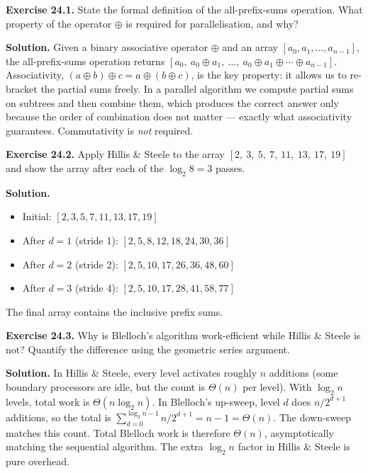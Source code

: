 \begin{ppexercises}
\textbf{Exercise 24.1.} State the formal definition of the
all-prefix-sums operation. What property of the operator $\oplus$ is
required for parallelisation, and why?

\medskip
\textbf{Solution.} Given a binary associative operator $\oplus$ and
an array $[a_0, a_1, \ldots, a_{n-1}]$, the all-prefix-sums operation
returns $[a_0,\ a_0\oplus a_1,\ \ldots,\ a_0\oplus a_1 \oplus \cdots \oplus a_{n-1}]$.
Associativity, $(a \oplus b) \oplus c = a \oplus (b \oplus c)$, is the
key property: it allows us to re-bracket the partial sums freely. In a
parallel algorithm we compute partial sums on subtrees and then combine
them, which produces the correct answer only because the order of
combination does not matter --- exactly what associativity guarantees.
Commutativity is \emph{not} required.
\end{ppexercises}

\begin{ppexercises}
\textbf{Exercise 24.2.} Apply Hillis \& Steele to the array
$[2,\ 3,\ 5,\ 7,\ 11,\ 13,\ 17,\ 19]$ and show the array after each
of the $\log_2 8 = 3$ passes.

\medskip
\textbf{Solution.}
\begin{itemize}[leftmargin=*]
  \item Initial: $[2, 3, 5, 7, 11, 13, 17, 19]$
  \item After $d=1$ (stride 1): $[2, 5, 8, 12, 18, 24, 30, 36]$
  \item After $d=2$ (stride 2): $[2, 5, 10, 17, 26, 36, 48, 60]$
  \item After $d=3$ (stride 4): $[2, 5, 10, 17, 28, 41, 58, 77]$
\end{itemize}
The final array contains the inclusive prefix sums.
\end{ppexercises}

\begin{ppexercises}
\textbf{Exercise 24.3.} Why is Blelloch's algorithm work-efficient
while Hillis \& Steele is not? Quantify the difference using the
geometric series argument.

\medskip
\textbf{Solution.} In Hillis \& Steele, every level activates roughly
$n$ additions (some boundary processors are idle, but the count is
$\Theta(n)$ per level). With $\log_2 n$ levels, total work is
$\Theta(n \log_2 n)$. In Blelloch's up-sweep, level $d$ does
$n / 2^{d+1}$ additions, so the total is
$\sum_{d=0}^{\log_2 n - 1} n/2^{d+1} = n - 1 = \Theta(n)$. The
down-sweep matches this count. Total Blelloch work is therefore
$\Theta(n)$, asymptotically matching the sequential algorithm. The
extra $\log_2 n$ factor in Hillis \& Steele is pure overhead.
\end{ppexercises}

